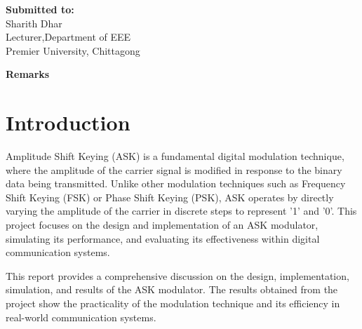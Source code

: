 \documentclass[12pt,a4paper]{article}
\begin{document}
\begin{titlepage}
    \begin{minipage}[t]{0.5\textwidth}
        \textbf{Submitted to:}
        \\ Sharith Dhar
        \\Lecturer,Department of EEE\\ Premier University, Chittagong
    \end{minipage}%
    \begin{minipage}[t]{0.6\textwidth}
        \raggedleft
        \textbf{Remarks}\\
        \vspace{0.5cm} %
    \end{minipage}

    \date{\today}
    \vfill
\end{titlepage}

\newpage
\section*{Introduction}
Amplitude Shift Keying (ASK) is a fundamental digital modulation technique, where the amplitude of the carrier signal is modified in response to the binary data being transmitted. Unlike other modulation techniques such as Frequency Shift Keying (FSK) or Phase Shift Keying (PSK), ASK operates by directly varying the amplitude of the carrier in discrete steps to represent '1' and '0'. This project focuses on the design and implementation of an ASK modulator, simulating its performance, and evaluating its effectiveness within digital communication systems.

This report provides a comprehensive discussion on the design, implementation, simulation, and results of the ASK modulator. The results obtained from the project show the practicality of the modulation technique and its efficiency in real-world communication systems.
\end{document}

